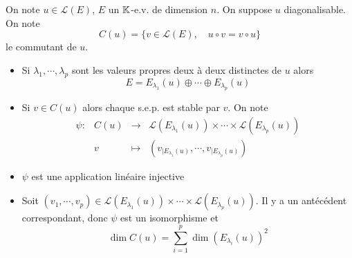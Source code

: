 On note $u\in\mathcal L(E)$, $E$ un $\mathbb K$-e.v. de dimension $n$. On suppose $u$ diagonalisable. On note \[
    C(u)=\{v\in\mathcal L(E), \quad u\circ v=v\circ u\}
\]
le commutant de $u$.

\begin{itemize}
    \item Si $\lambda_1, \cdots, \lambda_p$ sont les valeurs propres deux à deux distinctes de $u$ alors \[
            E=E_{\lambda_1}(u)\oplus \cdots \oplus E_{\lambda_p}(u)
        \]
    \item Si $v\in C(u)$ alors chaque s.e.p. est stable par $v$. On note \[
            \begin{matrix}
                \psi: & C(u) & \longrightarrow & \mathcal L(E_{\lambda_1}(u))\times \cdots \times \mathcal L(E_{\lambda_p}(u))\\
                      &v &\longmapsto & \left( v_{|E_{\lambda_1}(u)}, \cdots, v_{|E_{\lambda_p}(u)} \right)
            \end{matrix}
        \]
    \item $\psi$ est une application linéaire injective
    \item Soit $(v_1, \cdots, v_p)\in \mathcal L(E_{\lambda_1}(u))\times \cdots \times \mathcal L(E_{\lambda_p}(u))$. Il y a un antécédent correspondant, donc $\psi$ est un isomorphisme et \[
            \dim C(u)=\sum_{i=1}^p\dim(E_{\lambda_i}(u))^2
        \]
\end{itemize}
\endchapter
